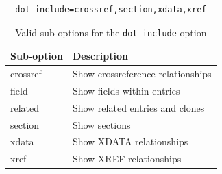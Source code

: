 \documentclass{ltxdockit}
\begin{document}
\begin{verbatim}
--dot-include=crossref,section,xdata,xref
\end{verbatim}

\begin{table}
\begin{center}
\small
\begin{tabular}{ll}
\toprule
Sub-option & Description\\
\midrule
crossref & Show crossreference relationships\\
field    & Show fields within entries\\
related  & Show related entries and clones\\
section  & Show sections\\
xdata    & Show XDATA relationships\\
xref     & Show XREF relationships\\
\bottomrule
\end{tabular}
\end{center}
\caption{Valid sub-options for the \texttt{dot-include} option}
\label{tab:graphopts}
\end{table}
\end{document}
